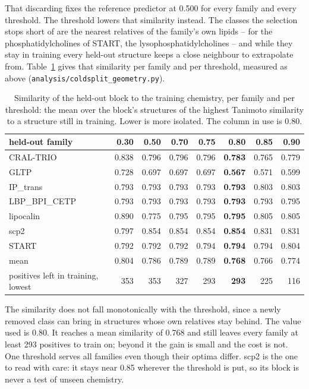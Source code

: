 That discarding fixes the reference predictor at 0.500 for every family and every threshold. The
threshold lowers that similarity instead. The classes the selection stops short of are the nearest
relatives of the family's own lipids -- for the phosphatidylcholines of START, the
lysophosphatidylcholines -- and while they stay in training every held-out structure keeps a close
neighbour to extrapolate from. Table~\ref{tab:coldsplitshare} gives that similarity per family and
per threshold, measured as above (\texttt{analysis/coldsplit\_geometry.py}).

\begin{table}[htbp]
\centering
\begin{tabular}{lrrrrrrr}
\hline
held-out family & 0.30 & 0.50 & 0.70 & 0.75 & \textbf{0.80} & 0.85 & 0.90 \\
\hline
CRAL-TRIO & 0.838 & 0.796 & 0.796 & 0.796 & \textbf{0.783} & 0.765 & 0.779 \\
GLTP & 0.728 & 0.697 & 0.697 & 0.697 & \textbf{0.567} & 0.571 & 0.599 \\
IP\_trans & 0.793 & 0.793 & 0.793 & 0.793 & \textbf{0.793} & 0.803 & 0.803 \\
LBP\_BPI\_CETP & 0.793 & 0.793 & 0.793 & 0.793 & \textbf{0.793} & 0.793 & 0.795 \\
lipocalin & 0.890 & 0.775 & 0.795 & 0.795 & \textbf{0.795} & 0.805 & 0.805 \\
scp2 & 0.797 & 0.854 & 0.854 & 0.854 & \textbf{0.854} & 0.831 & 0.831 \\
START & 0.792 & 0.792 & 0.792 & 0.794 & \textbf{0.794} & 0.794 & 0.804 \\
\hline
mean & 0.804 & 0.786 & 0.789 & 0.789 & \textbf{0.768} & 0.766 & 0.774 \\
positives left in training, lowest & 353 & 353 & 327 & 293 & \textbf{293} & 225 & 116 \\
\hline
\end{tabular}
\caption{Similarity of the held-out block to the training chemistry, per family and per threshold:
the mean over the block's structures of the highest Tanimoto similarity to a structure still in
training. Lower is more isolated. The column in use is 0.80.}
\label{tab:coldsplitshare}
\end{table}

The similarity does not fall monotonically with the threshold, since a newly removed class can
bring in structures whose own relatives stay behind. The value used is 0.80. It reaches a mean
similarity of 0.768 and still leaves every family at least 293 positives to train on; beyond it
the gain is small and the cost is not. One threshold serves all families even though their optima
differ. scp2 is the one to read with care: it stays near 0.85 wherever the threshold is put, so its
block is never a test of unseen chemistry.

